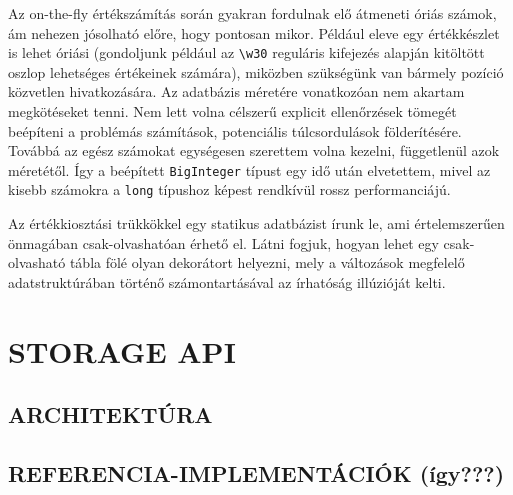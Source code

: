 \documentclass[
    parspace,
    noindent,
    nohyp,
]{elteiktdk}[2023/04/10]
\begin{document}
Az on-the-fly értékszámítás során gyakran fordulnak elő átmeneti óriás számok,
ám nehezen jósolható előre, hogy pontosan mikor.
Például eleve egy értékkészlet is lehet óriási
(gondoljunk például az \texttt{{\textbackslash}w{30}}
reguláris kifejezés alapján kitöltött oszlop lehetséges értékeinek számára),
miközben szükségünk van bármely pozíció közvetlen hivatkozására.
Az adatbázis méretére vonatkozóan nem akartam megkötéseket tenni.
Nem lett volna célszerű explicit ellenőrzések tömegét beépíteni
a problémás számítások, potenciális túlcsordulások földerítésére.
Továbbá az egész számokat egységesen szerettem volna kezelni, függetlenül azok méretétől.
Így a beépített \texttt{BigInteger} típust egy idő után elvetettem,
mivel az kisebb számokra a \texttt{long} típushoz képest rendkívül rossz performanciájú.







Az értékkiosztási trükkökkel egy statikus adatbázist írunk le,
ami értelemszerűen önmagában csak-olvashatóan érhető el.
Látni fogjuk, hogyan lehet egy csak-olvasható tábla fölé olyan dekorátort helyezni,
mely a változások megfelelő adatstruktúrában történő számontartásával
az írhatóság illúzióját kelti.























\chapter{STORAGE API}

\section{ARCHITEKTÚRA}

\section{REFERENCIA-IMPLEMENTÁCIÓK (így???)}
\end{document}
